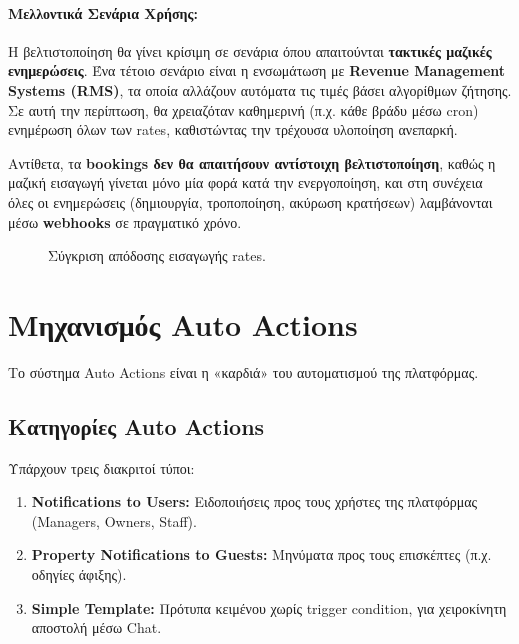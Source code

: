 \documentclass[
	12pt, %
	oneside, %
	greek,
	onehalfspacing, %
	liststotoc, %
	toctotoc, %
	parskip, %
	headsepline, %
]{MastersDoctoralThesis} %
\begin{document}
\paragraph{Μελλοντικά Σενάρια Χρήσης:}

Η βελτιστοποίηση θα γίνει κρίσιμη σε σενάρια όπου απαιτούνται \textbf{τακτικές μαζικές ενημερώσεις}. Ένα τέτοιο σενάριο είναι η ενσωμάτωση με \textbf{Revenue Management Systems (RMS)}, τα οποία αλλάζουν αυτόματα τις τιμές βάσει αλγορίθμων ζήτησης. Σε αυτή την περίπτωση, θα χρειαζόταν καθημερινή (π.χ. κάθε βράδυ μέσω cron) ενημέρωση όλων των rates, καθιστώντας την τρέχουσα υλοποίηση ανεπαρκή.

Αντίθετα, τα \textbf{bookings δεν θα απαιτήσουν αντίστοιχη βελτιστοποίηση}, καθώς η μαζική εισαγωγή γίνεται μόνο μία φορά κατά την ενεργοποίηση, και στη συνέχεια όλες οι ενημερώσεις (δημιουργία, τροποποίηση, ακύρωση κρατήσεων) λαμβάνονται μέσω \textbf{webhooks} σε πραγματικό χρόνο.

\begin{figure}[H]
    \centering
    \caption{Σύγκριση απόδοσης εισαγωγής rates.}
    \label{fig:rate-performance}
\end{figure}

\section{Μηχανισμός Auto Actions}
\label{sec:auto-actions}

Το σύστημα Auto Actions είναι η «καρδιά» του αυτοματισμού της πλατφόρμας.

\subsection{Κατηγορίες Auto Actions}
\label{subsec:auto-action-categories}

Υπάρχουν τρεις διακριτοί τύποι:

\begin{enumerate}
    \item \textbf{Notifications to Users:} Ειδοποιήσεις προς τους χρήστες της πλατφόρμας (Managers, Owners, Staff).
    \item \textbf{Property Notifications to Guests:} Μηνύματα προς τους επισκέπτες (π.χ. οδηγίες άφιξης).
    \item \textbf{Simple Template:} Πρότυπα κειμένου χωρίς trigger condition, για χειροκίνητη αποστολή μέσω Chat.
\end{enumerate}
\end{document}
